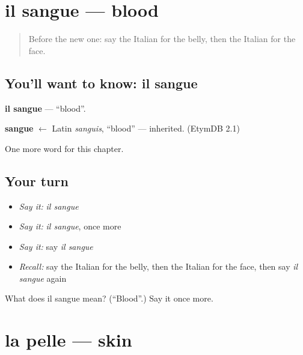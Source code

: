\section[il sangue]{il sangue — blood}

\label{lesson:IT-C39-sangue}



\begin{quote}
Before the new one: say the Italian for the belly, then the Italian for the face.
\end{quote}

\subsection*{You'll want to know: il sangue}
\textbf{il sangue} — \textquotedblleft{}blood\textquotedblright{}.

\begin{cousinweb}
\textbf{sangue} $\leftarrow$ Latin \emph{sanguis}, \textquotedblleft{}blood\textquotedblright{} — inherited. (EtymDB 2.1)
\end{cousinweb}

\begin{grammarlens}[title={What you've built}]
One more word for this chapter.
\end{grammarlens}

\subsection*{Your turn}
\begin{itemize}
\raggedright
  \item \emph{Say it:} \emph{il sangue}
  \item \emph{Say it:} \emph{il sangue}, once more
  \item \emph{Say it:} say \emph{il sangue}
  \item \emph{Recall:} say the Italian for the belly, then the Italian for the face, then say \emph{il sangue} again
\end{itemize}

\begin{tcolorbox}[breakable,colback=teal!4,colframe=teal!35!black,title={Before you move on}]
What does il sangue mean? (\textquotedblleft{}Blood\textquotedblright{}.) Say it once more.
\end{tcolorbox}
\section[la pelle]{la pelle — skin}

